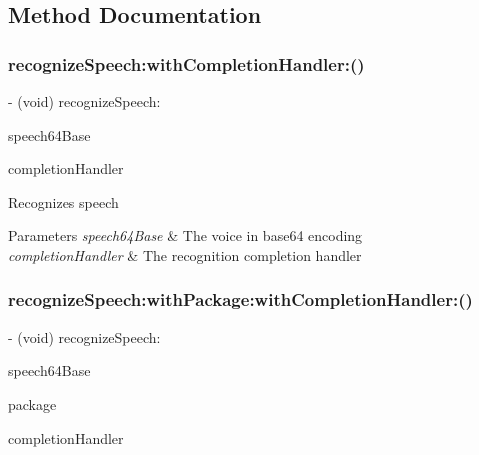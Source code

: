 \subsection{Method Documentation}
\hypertarget{interface_s_t_c_a_s_r_recognize_networking_manager_a464f2bc061d7a95fda633c8d59a38b68}{}\label{interface_s_t_c_a_s_r_recognize_networking_manager_a464f2bc061d7a95fda633c8d59a38b68} 
\subsubsection{\texorpdfstring{recognize\+Speech\+:with\+Completion\+Handler\+:()}{recognizeSpeech:withCompletionHandler:()}}
{\footnotesize\ttfamily -\/ (void) recognize\+Speech\+: \begin{DoxyParamCaption}\item[{(N\+S\+String $\ast$)}]{speech64\+Base }\item[{withCompletionHandler:(Completion\+Handler)}]{completion\+Handler }\end{DoxyParamCaption}}

Recognizes speech 
\begin{DoxyParams}{Parameters}
{\em speech64\+Base} & The voice in base64 encoding \\
\hline
{\em completion\+Handler} & The recognition completion handler \\
\hline
\end{DoxyParams}
\hypertarget{interface_s_t_c_a_s_r_recognize_networking_manager_a207d9ab2e972ca580bd7b251f98d7640}{}\label{interface_s_t_c_a_s_r_recognize_networking_manager_a207d9ab2e972ca580bd7b251f98d7640} 
\subsubsection{\texorpdfstring{recognize\+Speech\+:with\+Package\+:with\+Completion\+Handler\+:()}{recognizeSpeech:withPackage:withCompletionHandler:()}}
{\footnotesize\ttfamily -\/ (void) recognize\+Speech\+: \begin{DoxyParamCaption}\item[{(N\+S\+String $\ast$)}]{speech64\+Base }\item[{withPackage:(N\+S\+String $\ast$)}]{package }\item[{withCompletionHandler:(Completion\+Handler)}]{completion\+Handler }\end{DoxyParamCaption}}

